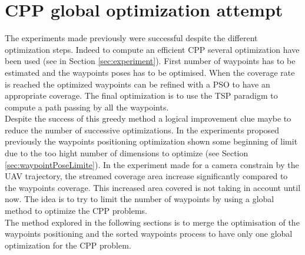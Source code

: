 \section{CPP global optimization attempt}

The experiments made previously were successful despite the different optimization steps. Indeed to compute an efficient CPP several optimization have been used (see in Section \ref{sec:experiment}). %
First number of waypoints has to be estimated and the waypoints poses has to be optimised. When the coverage rate is reached the optimized waypoints can be refined with a PSO to have an appropriate coverage. The final optimization is to use the TSP paradigm to compute a path passing by all the waypoints.%
\\Despite the success of this greedy method a logical improvement clue maybe to reduce the number of successive optimizations. In the experiments proposed previously the waypoints positioning optimization shown some beginning of limit due to the too hight number of dimensions to optimize (see Section \ref{sec:waypointPoseLimite}). 
In the experiment made for a camera constrain by the UAV trajectory, the streamed coverage area increase significantly compared to the waypoints coverage. This increased area covered is not taking in account until now. The idea is to try to limit the number of waypoints by using a global method to optimize the CPP problems.\\
The method explored in the following sections is to merge the optimisation of the waypoints positioning and the sorted waypoints process to have only one global optimization for the CPP problem. 
 
